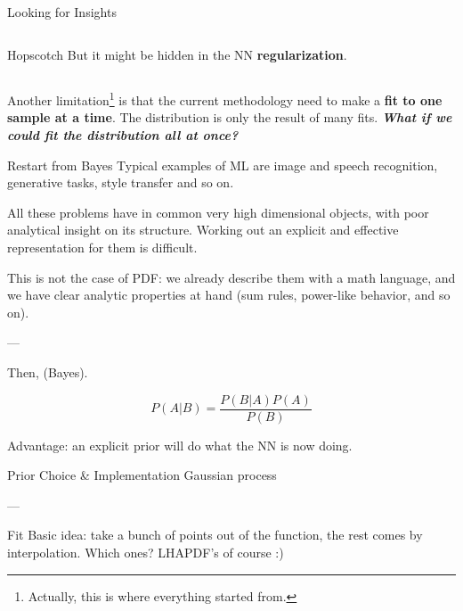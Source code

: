\documentclass[9pt]{beamer}
\begin{document}
\begin{frame}{Looking for Insights}
\begin{columns}
\begin{column}{0.5\textwidth}
\begin{exampleblock}{Hopscotch}
                But it might be hidden in the NN \textbf{regularization}.
            \end{exampleblock}

        \end{column}
    \end{columns}

    \vspace*{10pt}
    Another limitation\footnote{
        Actually, this is where everything started from.
    } is that the current methodology need to make a \textbf{fit to \alert{one
    sample} at a time}. The distribution is only the result of many fits.
    \textit{\textbf{What if we could fit the distribution all at once?}}
    \vspace*{-10pt}
\end{frame}

\begin{frame}{Restart from Bayes}
    Typical examples of ML are image and speech recognition, generative tasks,
    style transfer and so on.

    All these problems have in common very high dimensional objects, with poor
    analytical insight on its structure. Working out an explicit and effective
    representation for them is difficult.

    This is not the case of PDF: we already describe them with a math language,
    and we have clear analytic properties at hand (sum rules, power-like
    behavior, and so on).
    
    ---

    Then, (Bayes).

    \begin{equation*}
        P(A|B) = \frac{P(B|A) P(A)}{P(B)}
    \end{equation*}
    
    Advantage: an explicit prior will do what the NN is now doing.
\end{frame}

\begin{frame}{Prior Choice \& Implementation}
    Gaussian process
    
    ---

    Fit Basic idea: take a bunch of points out of the function, the rest comes
    by interpolation. Which ones? LHAPDF's of course :)
\end{frame}
\end{document}
